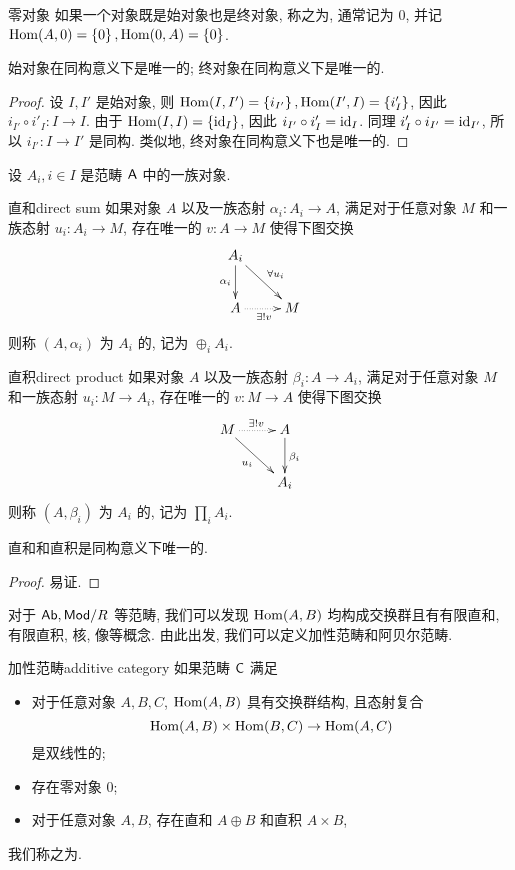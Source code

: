 \begin{definition}{零对象}{}
如果一个对象既是始对象也是终对象, 称之为, 通常记为 $0$, 并记 ${\mathrm{Hom}}(A,0)=\left\{0\right\},{\mathrm{Hom}}(0,A)=\left\{0\right\}$.
\end{definition}

\begin{proposition}{}{}
始对象在同构意义下是唯一的; 终对象在同构意义下是唯一的.
\end{proposition}
\begin{proof}
设 $I,I'$ 是始对象, 则 ${\mathrm{Hom}}(I,I')=\left\{i_{I'}\right\}, {\mathrm{Hom}}(I',I)=\left\{i'_I\right\}$, 因此 $i_{I'}\circ i'_I:I\to I$. 由于 ${\mathrm{Hom}}(I,I)=\left\{{\mathrm{id}}_I\right\}$, 因此 $i_{I'}\circ i'_I={\mathrm{id}}_I$. 同理 $i'_I\circ i_{I'}={\mathrm{id}}_{I'}$, 所以 $i_{I'}:I\to I'$ 是同构. 类似地, 终对象在同构意义下也是唯一的.
\end{proof}

设 $A_i,i\in I$ 是范畴 ${\mathsf{A}}$ 中的一族对象.

\begin{definition}{直和}{direct sum}
如果对象 $A$ 以及一族态射 $\alpha_i:A_i\to A$, 满足对于任意对象 $M$ 和一族态射 $u_i:A_i\to M$, 存在唯一的 $v:A\to M$ 使得下图交换
  \[\xymatrix{
A_i\ar[d]_{\alpha_i}\ar[rd]^{\forall u_i}&\\
A\ar@{.>}_{\exists ! v}[r]&M
}\]
则称 $(A,\alpha_i)$ 为 $A_i$ 的, 记为 $\oplus_i A_i$.
\end{definition}

\begin{definition}{直积}{direct product}
如果对象 $A$ 以及一族态射 $\beta_i:A\to A_i$, 满足对于任意对象 $M$ 和一族态射 $u_i:M\to A_i$, 存在唯一的 $v:M\to A$ 使得下图交换
  \[\xymatrix{
M\ar[rd]_{u_i}\ar@{.>}^{\exists ! v}[r]&A\ar[d]^{\beta_i}\\
&A_i
}\]
则称 $(A,\beta_i)$ 为 $A_i$ 的, 记为 $\prod_i A_i$.
\end{definition}

\begin{proposition}{}{}
直和和直积是同构意义下唯一的.
\end{proposition}
\begin{proof}
易证.
\end{proof}

对于 ${\mathsf{Ab}},{\mathsf{Mod}}/R$ 等范畴, 我们可以发现 ${\mathrm{Hom}}(A,B)$ 均构成交换群且有有限直和, 有限直积, 核, 像等概念. 由此出发, 我们可以定义加性范畴和阿贝尔范畴.

\begin{definition}{加性范畴}{additive category}
如果范畴 ${\mathsf{C}}$ 满足
\begin{itemize}
\item 对于任意对象 $A,B,C$, ${\mathrm{Hom}}(A,B)$ 具有交换群结构, 且态射复合
  \[{\mathrm{Hom}}(A,B)\times{\mathrm{Hom}}(B,C)\to {\mathrm{Hom}}(A,C)\]
是双线性的;
\item 存在零对象 $0$;
\item 对于任意对象 $A,B$, 存在直和 $A\oplus B$ 和直积 $A\times B$,
\end{itemize}
我们称之为.
\end{definition}

